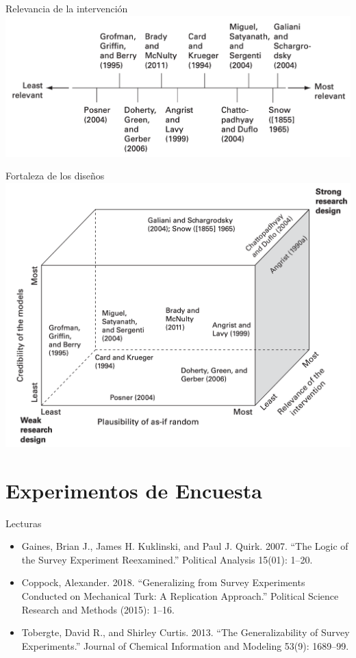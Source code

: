 \documentclass[
  ignorenonframetext,
]{beamer}
\begin{document}
\begin{frame}{Relevancia de la intervención}
\protect\hypertarget{relevancia-de-la-intervenciuxf3n}{}
\includegraphics{figs/relevance.png}
\end{frame}

\begin{frame}{Fortaleza de los diseños}
\protect\hypertarget{fortaleza-de-los-diseuxf1os}{}
\includegraphics{figs/strength.png}
\end{frame}

\hypertarget{experimentos-de-encuesta}{%
\section{Experimentos de Encuesta}\label{experimentos-de-encuesta}}

\begin{frame}{Lecturas}
\protect\hypertarget{lecturas-2}{}
\begin{itemize}
\item
  Gaines, Brian J., James H. Kuklinski, and Paul J. Quirk. 2007. ``The
  Logic of the Survey Experiment Reexamined.'' Political Analysis
  15(01): 1--20.
\item
  Coppock, Alexander. 2018. ``Generalizing from Survey Experiments
  Conducted on Mechanical Turk: A Replication Approach.'' Political
  Science Research and Methods (2015): 1--16.
\item
  Tobergte, David R., and Shirley Curtis. 2013. ``The Generalizability
  of Survey Experiments.'' Journal of Chemical Information and Modeling
  53(9): 1689--99.
\end{itemize}
\end{frame}
\end{document}

